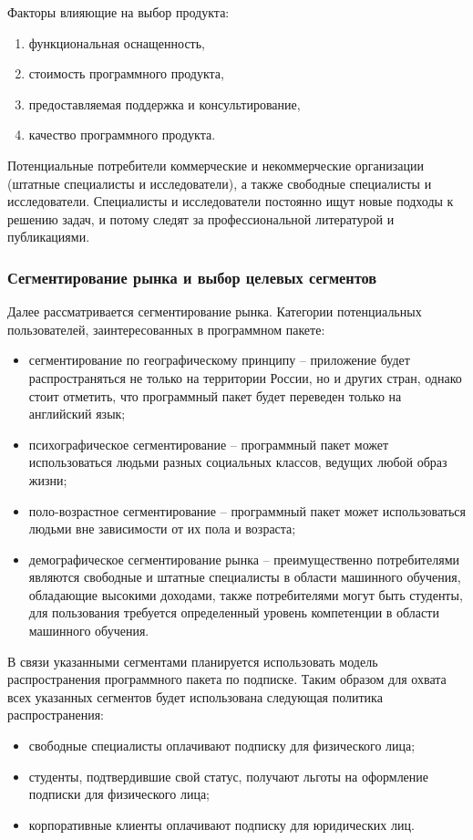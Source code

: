 \documentclass[../main]{subfiles}
\begin{document}
Факторы влияющие на выбор продукта:
\begin{enumerate}
    \item функциональная оснащенность,
    \item стоимость программного продукта,
    \item предоставляемая поддержка и консультирование,
    \item качество программного продукта.
\end{enumerate}

Потенциальные потребители коммерческие и некоммерческие организации (штатные специалисты и исследователи), а также свободные специалисты и исследователи. Специалисты и исследователи постоянно ищут новые подходы к решению задач, и потому следят за профессиональной литературой и публикациями.

\subsubsection{Сегментирование рынка и выбор целевых сегментов}
Далее рассматривается сегментирование рынка. Категории потенциальных пользователей, заинтересованных в программном пакете:
\begin{itemize}
    \item сегментирование по географическому принципу -- приложение будет распространяться не только на территории России, но и других стран, однако стоит отметить, что программный пакет будет переведен только на английский язык;
    \item психографическое сегментирование -- программный пакет может использоваться людьми разных социальных классов, ведущих любой образ жизни;
    \item поло-возрастное сегментирование -- программный пакет может использоваться людьми вне зависимости от их пола и возраста;
    \item демографическое сегментирование рынка -- преимущественно потребителями являются свободные и штатные специалисты в области машинного обучения, обладающие высокими доходами, также потребителями могут быть студенты, для пользования требуется определенный уровень компетенции в области машинного обучения.
\end{itemize}

В связи указанными сегментами планируется использовать модель распространения программного пакета по подписке. Таким образом для охвата всех указанных сегментов будет использована следующая политика распространения:
\begin{itemize}
    \item свободные специалисты оплачивают подписку для физического лица;
    \item студенты, подтвердившие свой статус, получают льготы на оформление подписки для физического лица;
    \item корпоративные клиенты оплачивают подписку для юридических лиц.
\end{itemize}
\end{document}
